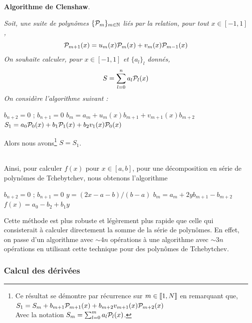 \documentclass[10.5pt]{article}
\begin{document}
\begin{multicols*}{2}
\noindent
\textbf{Algorithme de Clenshaw}. {\itshape
Soit, une suite de polynômes $\{\mathcal{P}_m\}_{m \in \mathbb{N}}$ liés par la relation, pour tout $x \in [-1,1]$, 
\begin{equation}
 \mathcal{P}_{m+1}(x) = u_m(x)\mathcal{P}_m(x) + v_m(x)\mathcal{P}_{m-1}(x)
\end{equation}
On souhaite calculer, pour $x \in [-1, 1]$ et $\{a_l\}_l$ donnés, 
\begin{equation}
  S = \sum_{l=0}^{n} a_l \mathcal{P}_l(x)
\end{equation}
On considère l'algorithme suivant :
\vspace*{-11pt}
\begin{algorithm}[H]
  \begin{algorithmic}[1]
    \STATE $b_{n+2} = 0$ ; $b_{n+1} = 0$
    \STATE $b_m = a_m + u_m(x)b_{m+1} + v_{m+1}(x)b_{m+2}$
    \ENDFOR
    \STATE $S_1 = a_0\mathcal{P}_0(x) + b_1\mathcal{P}_1(x) + b_2v_1(x)\mathcal{P}_0(x)$
  \end{algorithmic}
\end{algorithm}
\vspace*{-11pt}
\noindent
Alors nous avons\footnote{Ce résultat se démontre par récurrence sur $m \in  \llbracket 1,N \rrbracket $ en remarquant que,
$S_1 = S_m +  b_{m+1}\mathcal{P}_{m+1}(x) + b_{m+2}v_{m+1}(x)\mathcal{P}_{m+2}(x)$\\
Avec la notation $S_m = \sum_{l=0}^{m} a_l \mathcal{P}_l(x)$.} $S = S_1$. 
} \\

Ainsi, pour calculer $f(x)$ pour $x \in [a,b]$, pour une décomposition en série de polynômes de Tchebytchev, nous obtenons l'algorithme

\begin{algorithm}[H]
  \begin{algorithmic}[1]
    \STATE $b_{n+2} = 0$ ; $b_{n+1} = 0$
    \STATE $y = (2x-a-b)/(b-a)$
    \STATE $b_m = a_m + 2yb_{m+1} - b_{m+2}$
    \ENDFOR
    \STATE $f(x) = a_0 - b_2 + b_1y$
  \end{algorithmic}
\end{algorithm}

Cette méthode \cite{clenshaw1955note} est plus robuste et légèrement plus rapide que celle qui consisterait à calculer directement la somme de la série de polynômes. En effet, on passe d'un algorithme avec $\sim 4n$ opérations à une algorithme avec $\sim 3n$ opérations en utilisant cette technique pour des polynômes de Tchebytchev. 


\subsubsection{Calcul des dérivées}


\end{multicols*}
\end{document}
